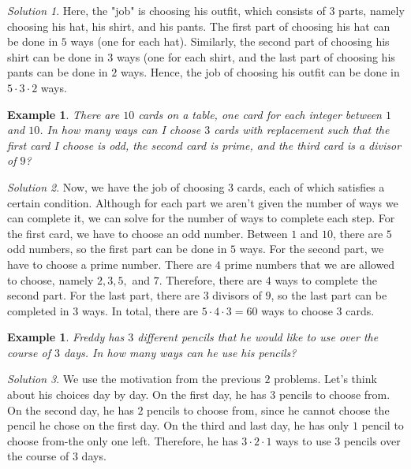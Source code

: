 \documentclass[letterpaper]{article}
\newtheorem{example}[thm]{Example}
\theoremstyle{remark}
\newtheorem*{solution}{Solution}
\theoremstyle{definition}
\begin{document}
\begin{solution}

Here, the "job" is choosing his outfit, which consists of $3$ parts, namely choosing his hat, his shirt, and his pants. The first part of choosing his hat can be done in $5$ ways (one for each hat). Similarly, the second part of choosing his shirt can be done in $3$ ways (one for each shirt, and the last part of choosing his pants can be done in $2$ ways. Hence, the job of choosing his outfit can be done in $5\cdot 3 \cdot 2$ ways.
\end{solution}

\begin{example}

There are $10$ cards on a table, one card for each integer between $1$ and $10$. In how many ways can I choose $3$ cards with replacement such that the first card I choose is odd, the second card is prime, and the third card is a divisor of $9$?
\end{example}

\begin{solution}

Now, we have the job of choosing $3$ cards, each of which satisfies a certain condition. Although for each part we aren't given the number of ways we can complete it, we can solve for the number of ways to complete each step. For the first card, we have to choose an odd number. Between $1$ and $10$, there are $5$ odd numbers, so the first part can be done in $5$ ways. For the second part, we have to choose a prime number. There are $4$ prime numbers that we are allowed to choose, namely $2, 3, 5, $ and $7$. Therefore, there are $4$ ways to complete the second part. For the last part, there are $3$ divisors of $9$, so the last part can be completed in $3$ ways. In total, there are $5\cdot 4 \cdot 3=60$ ways to choose $3$ cards.
\end{solution}


\begin{example}
Freddy has $3$ different pencils that he would like to use over the course of $3$ days. In how many ways can he use his pencils?

\end{example}

\begin{solution}
We use the motivation from the previous $2$ problems. Let's think about his choices day by day. On the first day, he has $3$ pencils to choose from. On the second day, he has $2$ pencils to choose from, since he cannot choose the pencil he chose on the first day. On the third and last day, he has only $1$ pencil to choose from-the only one left. Therefore, he has $3\cdot 2\cdot 1$ ways to use $3$ pencils over the course of $3$ days.
\end{solution}
\end{document}
